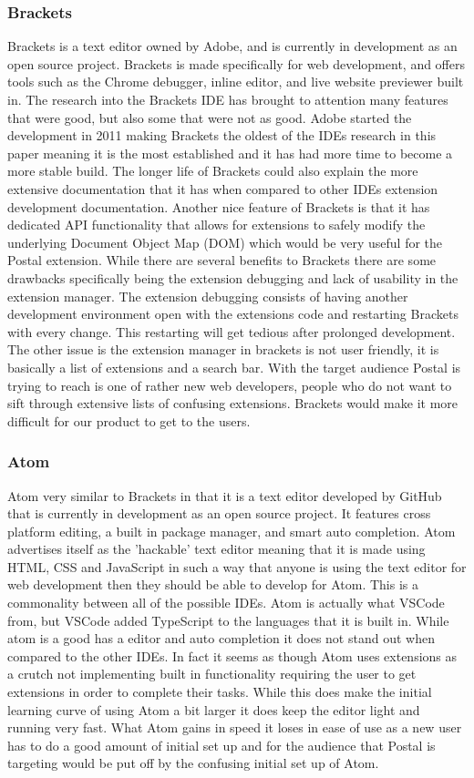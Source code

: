 \documentclass[letterpaper,10pt,titlepage,draftclsnofoot,onecolumn,onesided] {IEEEtran}
\begin{document}
\subsubsection{Brackets}
Brackets is a text editor owned by Adobe, and is currently in development as an open source project. \cite{Brackets}
Brackets is made specifically for web development, and offers tools such as the Chrome debugger, inline editor, and live website previewer built in.
The research into the Brackets IDE has brought to attention many features that were good, but also some that were not as good.
Adobe started the development in 2011 making Brackets the oldest of the IDEs research in this paper meaning it is the most established and it has had more time to become a more stable build. 
The longer life of Brackets could also explain the more extensive documentation that it has when compared to other IDEs extension development documentation.
Another nice feature of Brackets is that it has dedicated API functionality that allows for extensions to safely modify the underlying Document Object Map (DOM) which would be very useful for the Postal extension.
While there are several benefits to Brackets there are some drawbacks specifically being the extension debugging and lack of usability in the extension manager. 
The extension debugging consists of having another development environment open with the extensions code and restarting Brackets with every change.
This restarting will get tedious after prolonged development.
The other issue is the extension manager in brackets is not user friendly, it is basically a list of extensions and a search bar.
With the target audience Postal is trying to reach is one of rather new web developers, people who do not want to sift through extensive lists of confusing extensions. 
Brackets would make it more difficult for our product to get to the users.

\subsubsection{Atom}
Atom  very similar to Brackets in that it is a text editor developed by GitHub that is currently in development as an open source project. 
It features cross platform editing, a built in package manager, and smart auto completion.
Atom advertises itself as the 'hackable' text editor meaning that it is made using HTML, CSS and JavaScript in such a way that anyone is using the text editor for web development then they should be able to develop for Atom. \cite{Atom}
This is a commonality between all of the possible IDEs.
Atom is actually what VSCode from, but VSCode added TypeScript to the languages that it is built in.
While atom is a good has a editor and auto completion it does not stand out when compared to the other IDEs. 
In fact it seems as though Atom uses extensions as a crutch not implementing built in functionality requiring the user to get extensions in order to complete their tasks. 
While this does make the initial learning curve of using Atom a bit larger it does keep the editor light and running very fast.
What Atom gains in speed it loses in ease of use as a new user has to do a good amount of initial set up and for the audience that Postal is targeting would be put off by the confusing initial set up of Atom.
\end{document}
